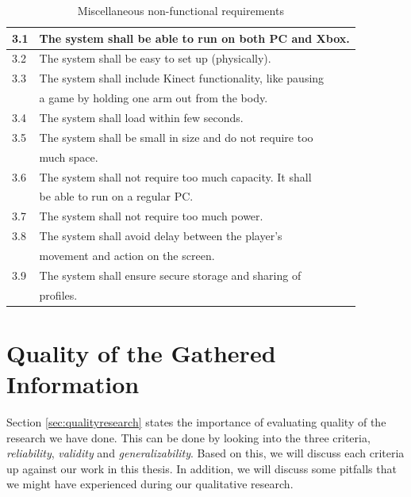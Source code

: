 \begin{table} [H]
\label{tab:nfunc2}
\centering
\begin{tabular}{|l|l|}
\hline
3.1 & The system shall be able to run on both PC and Xbox. \\ \hline
3.2 & The system shall be easy to set up (physically).\\ \hline
3.3 & The system shall include Kinect functionality, like pausing \\ & a game by holding one arm out from the body. \\ \hline
3.4 & The system shall load within few seconds.\\ \hline
3.5 & The system shall be small in size and do not require too \\&  much space.\\ \hline
3.6 & The system shall not require too much capacity. It shall \\ & be able to run on a regular PC. \\ \hline
3.7 & The system shall not require too much power. \\ \hline
3.8 & The system shall avoid delay between the player's \\ & movement and action on the screen.\\ \hline
3.9 & The system shall ensure secure storage and sharing of \\ & profiles. \\ \hline
\end{tabular}
\caption[Miscellaneous non-functional requirements]{Miscellaneous non-functional requirements}
\end{table} 

\section{Quality of the Gathered Information}
\label{sec:discQuality}

Section \ref{sec:qualityresearch} states the importance of evaluating quality of the research we have done. This can be done by looking into the three criteria, \emph{reliability}, \emph{validity} and \emph{generalizability}. Based on this, we will discuss each criteria up against our work in this thesis. In addition, we will discuss some pitfalls that we might have experienced during our qualitative research.  

